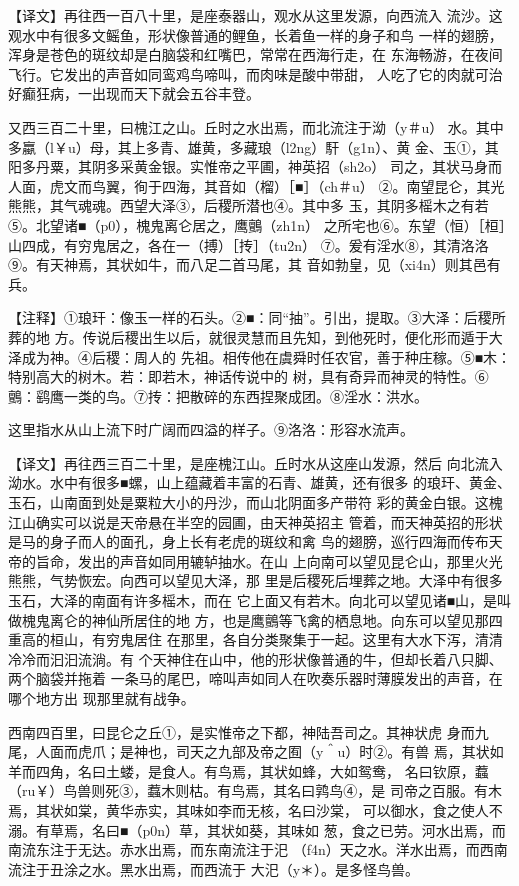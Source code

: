 \documentclass[a4paper,12pt,UTF8,twoside]{ctexbook}
\begin{document}
【译文】再往西一百八十里，是座泰器山，观水从这里发源，向西流入 流沙。这观水中有很多文鳐鱼，形状像普通的鲤鱼，长着鱼一样的身子和鸟 一样的翅膀，浑身是苍色的斑纹却是白脑袋和红嘴巴，常常在西海行走，在 东海畅游，在夜间飞行。它发出的声音如同鸾鸡鸟啼叫，而肉味是酸中带甜， 人吃了它的肉就可治好癫狂病，一出现而天下就会五谷丰登。

又西三百二十里，曰槐江之山。丘时之水出焉，而北流注于泑（y＃u） 水。其中多蠃（l￥u）母，其上多青、雄黄，多藏琅（l2ng）馯（g1n）、黄 金、玉①，其阳多丹粟，其阴多采黄金银。实惟帝之平圃，神英招（sh2o） 司之，其状马身而人面，虎文而鸟翼，徇于四海，其音如（榴）［■］（ch＃u） ②。南望昆仑，其光熊熊，其气魂魂。西望大泽③，后稷所潜也④。其中多 玉，其阴多榣木之有若⑤。北望诸■（p0），槐鬼离仑居之，鹰鸇（zh1n） 之所宅也⑥。东望（恒）［桓］山四成，有穷鬼居之，各在一（搏）［抟］（tu2n） ⑦。爰有淫水⑧，其清洛洛⑨。有天神焉，其状如牛，而八足二首马尾，其 音如勃皇，见（xi4n）则其邑有兵。

【注释】①琅玕：像玉一样的石头。②■：同“抽”。引出，提取。③大泽：后稷所葬的地 方。传说后稷出生以后，就很灵慧而且先知，到他死时，便化形而遁于大泽成为神。④后稷：周人的 先祖。相传他在虞舜时任农官，善于种庄稼。⑤■木：特别高大的树木。若：即若木，神话传说中的 树，具有奇异而神灵的特性。⑥鸇：鹞鹰一类的鸟。⑦抟：把散碎的东西捏聚成团。⑧淫水：洪水。

这里指水从山上流下时广阔而四溢的样子。⑨洛洛：形容水流声。

【译文】再往西三百二十里，是座槐江山。丘时水从这座山发源，然后 向北流入泑水。水中有很多■螺，山上蕴藏着丰富的石青、雄黄，还有很多 的琅玕、黄金、玉石，山南面到处是粟粒大小的丹沙，而山北阴面多产带符 彩的黄金白银。这槐江山确实可以说是天帝悬在半空的园圃，由天神英招主 管着，而天神英招的形状是马的身子而人的面孔，身上长有老虎的斑纹和禽 鸟的翅膀，巡行四海而传布天帝的旨命，发出的声音如同用辘轳抽水。在山 上向南可以望见昆仑山，那里火光熊熊，气势恢宏。向西可以望见大泽，那 里是后稷死后埋葬之地。大泽中有很多玉石，大泽的南面有许多榣木，而在 它上面又有若木。向北可以望见诸■山，是叫做槐鬼离仑的神仙所居住的地 方，也是鹰鸇等飞禽的栖息地。向东可以望见那四重高的桓山，有穷鬼居住 在那里，各自分类聚集于一起。这里有大水下泻，清清冷冷而汩汩流淌。有 个天神住在山中，他的形状像普通的牛，但却长着八只脚、两个脑袋并拖着 一条马的尾巴，啼叫声如同人在吹奏乐器时薄膜发出的声音，在哪个地方出 现那里就有战争。

西南四百里，曰昆仑之丘①，是实惟帝之下都，神陆吾司之。其神状虎 身而九尾，人面而虎爪；是神也，司天之九部及帝之囿（y＾u）时②。有兽 焉，其状如羊而四角，名曰土蝼，是食人。有鸟焉，其状如蜂，大如鸳鸯， 名曰钦原，蠚（ru￥）鸟兽则死③，蠚木则枯。有鸟焉，其名曰鹑鸟④，是 司帝之百服。有木焉，其状如棠，黄华赤实，其味如李而无核，名曰沙棠， 可以御水，食之使人不溺。有草焉，名曰■（p0n）草，其状如葵，其味如 葱，食之已劳。河水出焉，而南流东注于无达。赤水出焉，而东南流注于汜 （f4n）天之水。洋水出焉，而西南流注于丑涂之水。黑水出焉，而西流于 大汜（y＊）。是多怪鸟兽。
\end{document}

